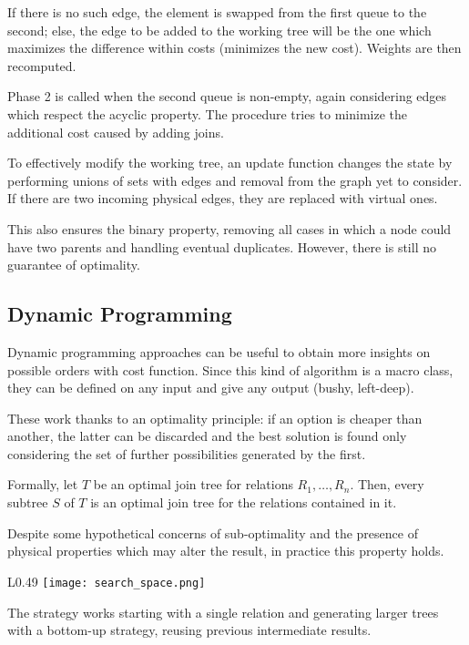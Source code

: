 If there is no such edge, the element is swapped from the first queue to the second; else, the edge to be added to the working tree will be the one which maximizes the difference within costs (minimizes the new cost). Weights are then recomputed. 

Phase 2 is called when the second queue is non-empty, again considering edges which respect the acyclic property. The procedure tries to minimize the additional cost caused by adding joins. 

To effectively modify the working tree, an update function changes the state by performing unions of sets with edges and removal from the graph yet to consider. If there are two incoming physical edges, they are replaced with virtual ones. 

This also ensures the binary property, removing all cases in which a node could have two parents and handling eventual duplicates. However, there is still no guarantee of optimality. 

\subsection{Dynamic Programming}
Dynamic programming approaches can be useful to obtain more insights on possible orders with cost function. Since this kind of algorithm is a macro class, they can be defined on any input and give any output (bushy, left-deep).

These work thanks to an optimality principle: if an option is cheaper than another, the latter can be discarded and the best solution is found only considering the set of further possibilities generated by the first.

Formally, let $T$ be an optimal join tree for relations $R_1, \dots, R_n$. Then, every subtree $S$ of $T$ is an optimal join tree for the relations contained in it.

Despite some hypothetical concerns of sub-optimality and the presence of physical properties which may alter the result, in practice this property holds.

\begin{wrapfigure}{L}{0.49\textwidth}
	\vspace{-10pt}
	\texttt{[image: search\_space.png]}
	\vspace{-40pt}
\end{wrapfigure}

The strategy works starting with a single relation and generating larger trees with a bottom-up strategy, reusing previous intermediate results.

